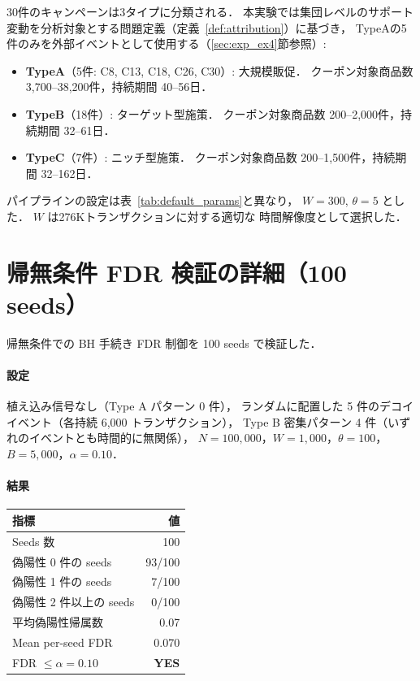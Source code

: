30件のキャンペーンは3タイプに分類される．
本実験では集団レベルのサポート変動を分析対象とする問題定義（定義~\ref{def:attribution}）に基づき，
TypeAの5件のみを外部イベントとして使用する（\ref{sec:exp_ex4}節参照）:
\begin{itemize}
\item \textbf{TypeA}（5件: C8, C13, C18, C26, C30）: 大規模販促．
    クーポン対象商品数 3{,}700--38{,}200件，持続期間 40--56日．
\item \textbf{TypeB}（18件）: ターゲット型施策．
    クーポン対象商品数 200--2{,}000件，持続期間 32--61日．
\item \textbf{TypeC}（7件）: ニッチ型施策．
    クーポン対象商品数 200--1{,}500件，持続期間 32--162日．
\end{itemize}

パイプラインの設定は表~\ref{tab:default_params}と異なり，
$W = 300$, $\theta = 5$ とした．
$W$ は276Kトランザクションに対する適切な
時間解像度として選択した．

\section{帰無条件 FDR 検証の詳細（100 seeds）}\label{app:null_fdr}

帰無条件での BH 手続き FDR 制御を 100 seeds で検証した．

\paragraph{設定}
植え込み信号なし（Type A パターン 0 件），
ランダムに配置した 5 件のデコイイベント（各持続 6,000 トランザクション），
Type B 密集パターン 4 件（いずれのイベントとも時間的に無関係），
$N = 100{,}000$，$W = 1{,}000$，$\theta = 100$，$B = 5{,}000$，$\alpha = 0.10$．

\paragraph{結果}

\begin{center}
\begin{tabular}{lr}
\toprule
指標 & 値 \\
\midrule
Seeds 数 & 100 \\
偽陽性 0 件の seeds & 93/100 \\
偽陽性 1 件の seeds & 7/100 \\
偽陽性 2 件以上の seeds & 0/100 \\
平均偽陽性帰属数 & 0.07 \\
Mean per-seed FDR & 0.070 \\
FDR $\leq \alpha = 0.10$ & \textbf{YES} \\
\bottomrule
\end{tabular}
\end{center}

